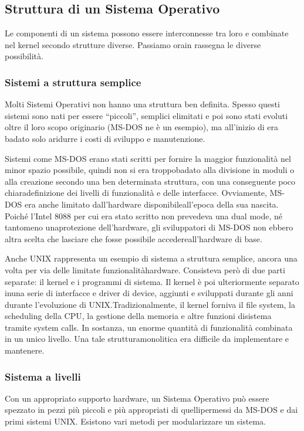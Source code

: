 \documentclass[a4]{article}
\begin{document}
\subsection{Struttura di un Sistema Operativo}
Le componenti di un sistema possono essere interconnesse tra loro e combinate nel kernel secondo strutture diverse. Passiamo orain rassegna le diverse possibilità.

\subsubsection{Sistemi a struttura semplice}
Molti Sistemi Operativi non hanno una struttura ben definita. Spesso questi sistemi sono nati per essere ``piccoli'', semplici elimitati e poi sono stati evoluti oltre il loro scopo originario (MS-DOS ne è un esempio), ma all'inizio di era badato solo aridurre i costi di sviluppo e manutenzione.

Sistemi come MS-DOS erano stati scritti per fornire la maggior funzionalità nel minor spazio possibile, quindi non si era troppobadato alla divisione in moduli o alla creazione secondo una ben determinata struttura, con una conseguente poco chiaradefinizione dei livelli di funzionalità e delle interfacce. Ovviamente, MS-DOS era anche limitato dall'hardware disponibileall'epoca della sua nascita. Poiché l'Intel 8088 per cui era stato scritto non prevedeva una dual mode, né tantomeno unaprotezione dell'hardware, gli sviluppatori di MS-DOS non ebbero altra scelta che lasciare che fosse possibile accedereall'hardware di base.

Anche UNIX rappresenta un esempio di sistema a struttura semplice, ancora una volta per via delle limitate funzionalitàhardware. Consisteva però di due parti separate: il kernel e i programmi di sistema. Il kernel è poi ulteriormente separato inuna serie di interfacce e driver di device, aggiunti e sviluppati durante gli anni durante l'evoluzione di UNIX.Tradizionalmente, il kernel forniva il file system, la scheduling della CPU, la gestione della memoria e altre funzioni disistema tramite system calls. In sostanza, un enorme quantità di funzionalità combinata in un unico livello. Una tale strutturamonolitica era difficile da implementare e mantenere.

\subsubsection{Sistema a livelli}
Con un appropriato supporto hardware, un Sistema Operativo può essere spezzato in pezzi più piccoli e più appropriati di quellipermessi da MS-DOS e dai primi sistemi UNIX. Esistono vari metodi per modularizzare un sistema.
\end{document}
